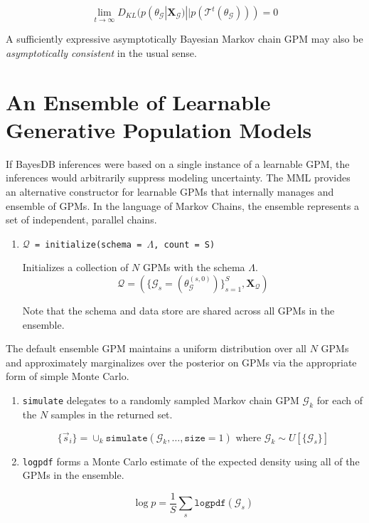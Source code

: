 \documentclass[10pt,letterpaper]{article}
\newcommand{\set}[1]{\{#1\}}
\begin{document}
\begin{equation*}
\lim_{t\to\infty}D_{KL}(p(\theta_\mathcal{G}|\mathbf{X_\mathcal{G}}) || p(\mathcal{T}^t(\theta_\mathcal{G}))) = 0
\end{equation*}

A sufficiently expressive asymptotically Bayesian Markov chain GPM may also be \textit{asymptotically consistent} in the usual sense.

\section{An Ensemble of Learnable Generative Population Models} \label{sec:ensemble}

If BayesDB inferences were based on a single instance of a learnable GPM, the inferences would arbitrarily suppress modeling uncertainty. The MML provides an alternative constructor for learnable GPMs that internally manages and ensemble of GPMs. In the language of Markov Chains, the ensemble represents a set of independent, parallel chains.

\begin{enumerate}
\item \texttt{$\mathcal{Q}$ = initialize(schema = $\Lambda$, count = S)}

    Initializes a collection of $N$ GPMs with the schema $\Lambda$.
    $$
    \mathcal{Q} = 
    (\set{\mathcal{G}_s = (\theta_{\mathcal{G}}^{(s,0)})}_{s=1}^S, \mathbf{X_\mathcal{Q}})
    $$

    Note that the schema and data store are shared across all GPMs in the ensemble.
\end{enumerate}

The default ensemble GPM maintains a uniform distribution over all $N$ GPMs and approximately marginalizes over the posterior on GPMs via the appropriate form of simple Monte Carlo.

\begin{enumerate}
\item \texttt{simulate} delegates to a randomly sampled Markov chain GPM $\mathcal{G}_k$ for each of the $N$ samples in the returned set.

    $$
    \set{\vec{s}_i} = \cup_k \texttt{simulate} (\mathcal{G}_k,\dots,\texttt{size} = 1) \text{ where }
    \mathcal{G}_k \sim U[\set{\mathcal{G}_s}]
    $$

\item \texttt{logpdf} forms a Monte Carlo estimate of the expected density using all of the GPMs in the ensemble.

    $$
    \log p = \frac{1}{S}\sum_s\texttt{logpdf}(\mathcal{G}_s)
    $$
\end{enumerate}
\end{document}
